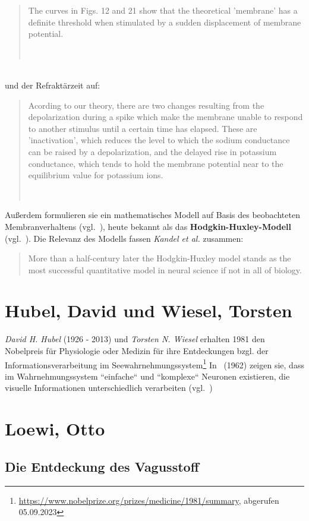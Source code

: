 \blockquote[{~\cite[535]{HH52}}]{
    The curves in Figs. 12 and 21 show that the theoretical 'membrane' has a definite threshold when stimulated by a sudden displacement of membrane potential.
}\\

\noindent
und der Refraktärzeit auf:

\blockquote[{~\cite[532]{HH52}}]{
    Acording to our theory, there are two changes resulting from the depolarization during a spike which make the membrane unable to respond to another stimulus until a certain time has elapsed. These are 'inactivation', which reduces the level to which the sodium conductance can be raised by a depolarization, and the delayed rise in potassium conductance, which tends to hold the membrane potential near to the equilibrium value for potassium ions.
}

Außerdem formulieren sie ein mathematisches Modell auf Basis des beobachteten Membranverhaltens (vgl.~\cite[501, Fig. 1.]{HH52}), heute bekannt als das \textbf{Hodgkin-Huxley-Modell} (vgl.~\cite[144]{Koc98}).
 Die Relevanz des Modells fassen \textit{Kandel et al.} zusammen:

\blockquote[{\cite[156]{KSJ+13}}]{
    More than a half-century later the Hodgkin-Huxley model stands as the most successful quantitative model in neural science if not in all of biology.
}



\section{Hubel, David und Wiesel, Torsten}\label{appendix:hubelwiesel}

\textit{David H. Hubel} (1926 - 2013) und \textit{Torsten N. Wiesel} erhalten 1981 den Nobelpreis für Physiologie oder Medizin für ihre Entdeckungen bzgl. der Informationsverarbeitung im Seewahrnehmungssystem\footnote{
    \url{https://www.nobelprize.org/prizes/medicine/1981/summary}, abgerufen 05.09.2023
}
In~\cite{HW62} (1962) zeigen sie, dass im Wahrnehmungssystem ``einfache`` und ``komplexe`` Neuronen existieren, die visuelle Informationen unterschiedlich verarbeiten (vgl.~\cite[2819]{Wur09})

\section{Loewi, Otto}\label{appendix:loewi}
\subsection*{Die Entdeckung des Vagusstoff}

